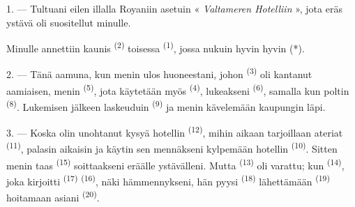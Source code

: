 %
%


\VUsaut{3.0mm}
\VUsaut{1.6mm}
\VUsaut{2.0mm}
\VUsaut{3.4mm}

1. --- Tultuani eilen illalla Royaniin asetuin
« \textit{Valtameren Hotelliin} », jota eräs ystävä oli suositellut minulle.

Minulle annettiin kaunis  \textsuperscript{(2)} toisessa
 \textsuperscript{(1)}, jossa nukuin hyvin hyvin (*).

2. --- Tänä aamuna, kun menin ulos huoneestani, johon 
\textsuperscript{(3)} oli kantanut aamiaisen, menin 
\textsuperscript{(5)}, jota käytetään myös 
\textsuperscript{(4)}, lukeakseni  \textsuperscript{(6)},
samalla kun poltin  \textsuperscript{(8)}. Lukemisen jälkeen
laskeuduin  \textsuperscript{(9)} ja menin kävelemään kaupungin
läpi.

3. --- Koska olin unohtanut kysyä hotellin 
\textsuperscript{(12)}, mihin aikaan tarjoillaan ateriat  \textsuperscript{(11)}, palasin aikaisin ja käytin sen mennäkseni
kylpemään hotellin  \textsuperscript{(10)}. Sitten menin
taas  \textsuperscript{(15)} soittaakseni eräälle ystävälleni.
Mutta  \textsuperscript{(13)} oli varattu; kun
 \textsuperscript{(14)}, joka kirjoitti 
\textsuperscript{(17)}  \textsuperscript{(16)},
näki hämmennykseni, hän pyysi  \textsuperscript{(18)}
lähettämään  \textsuperscript{(19)} hoitamaan asiani
 \textsuperscript{(20)}.

